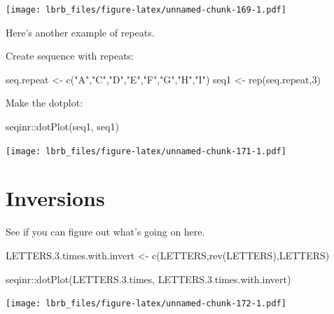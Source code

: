 \documentclass[
]{book}
\newenvironment{Shaded}{\begin{snugshade}}{\end{snugshade}}
\newcommand{\DecValTok}[1]{\textcolor[rgb]{0.00,0.00,0.81}{#1}}
\newcommand{\FloatTok}[1]{\textcolor[rgb]{0.00,0.00,0.81}{#1}}
\newcommand{\FunctionTok}[1]{\textcolor[rgb]{0.00,0.00,0.00}{#1}}
\newcommand{\NormalTok}[1]{#1}
\newcommand{\OtherTok}[1]{\textcolor[rgb]{0.56,0.35,0.01}{#1}}
\newcommand{\SpecialCharTok}[1]{\textcolor[rgb]{0.00,0.00,0.00}{#1}}
\newcommand{\StringTok}[1]{\textcolor[rgb]{0.31,0.60,0.02}{#1}}
\begin{document}
\texttt{[image: lbrb\_files/figure-latex/unnamed-chunk-169-1.pdf]}

Here's another example of repeats.

Create sequence with repeats:

\begin{Shaded}
\begin{Highlighting}[]
\NormalTok{seq.repeat }\OtherTok{\textless{}{-}} \FunctionTok{c}\NormalTok{(}\StringTok{"A"}\NormalTok{,}\StringTok{"C"}\NormalTok{,}\StringTok{"D"}\NormalTok{,}\StringTok{"E"}\NormalTok{,}\StringTok{"F"}\NormalTok{,}\StringTok{"G"}\NormalTok{,}\StringTok{"H"}\NormalTok{,}\StringTok{"I"}\NormalTok{)}
\NormalTok{seq1 }\OtherTok{\textless{}{-}} \FunctionTok{rep}\NormalTok{(seq.repeat,}\DecValTok{3}\NormalTok{)}
\end{Highlighting}
\end{Shaded}

Make the dotplot:

\begin{Shaded}
\begin{Highlighting}[]
\NormalTok{seqinr}\SpecialCharTok{::}\FunctionTok{dotPlot}\NormalTok{(seq1, }
\NormalTok{                seq1)}
\end{Highlighting}
\end{Shaded}

\texttt{[image: lbrb\_files/figure-latex/unnamed-chunk-171-1.pdf]}

\hypertarget{inversions}{%
\section{Inversions}\label{inversions}}

See if you can figure out what's going on here.

\begin{Shaded}
\begin{Highlighting}[]
\NormalTok{LETTERS.}\FloatTok{3.}\NormalTok{times.with.invert }\OtherTok{\textless{}{-}} \FunctionTok{c}\NormalTok{(LETTERS,}\FunctionTok{rev}\NormalTok{(LETTERS),LETTERS)}

\NormalTok{seqinr}\SpecialCharTok{::}\FunctionTok{dotPlot}\NormalTok{(LETTERS.}\FloatTok{3.}\NormalTok{times, }
\NormalTok{                LETTERS.}\FloatTok{3.}\NormalTok{times.with.invert)}
\end{Highlighting}
\end{Shaded}

\texttt{[image: lbrb\_files/figure-latex/unnamed-chunk-172-1.pdf]}
\end{document}
